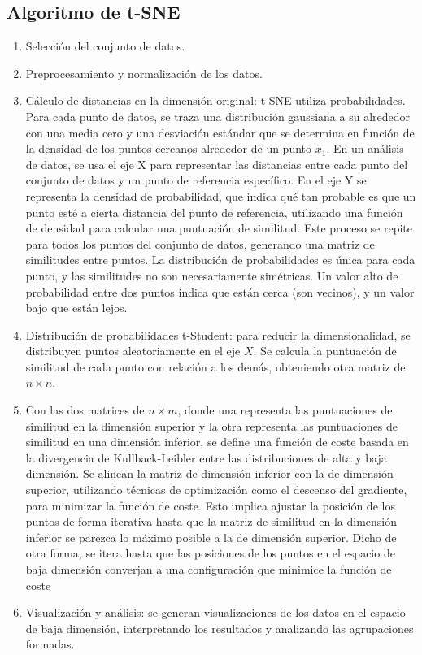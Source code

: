 \subsection{Algoritmo de t-SNE}
\begin{enumerate}
    \item Selección del conjunto de datos.
    \item Preprocesamiento y normalización de los datos.

    \item Cálculo de distancias en la dimensión original: t-SNE utiliza probabilidades. Para cada punto de datos, se traza una distribución gaussiana a su alrededor con una media cero y una desviación estándar que se determina en función de la densidad de los puntos cercanos alrededor de un punto $x_1$. En un análisis de datos, se usa el eje X para representar las distancias entre cada punto del conjunto de datos y un punto de referencia específico. En el eje Y se representa la densidad de probabilidad, que indica qué tan probable es que un punto esté a cierta distancia del punto de referencia, utilizando una función de densidad para calcular una puntuación de similitud. Este proceso se repite para todos los puntos del conjunto de datos, generando una matriz de similitudes entre puntos. La distribución de probabilidades es única para cada punto, y las similitudes no son necesariamente simétricas. Un valor alto de probabilidad entre dos puntos indica que están cerca (son vecinos), y un valor bajo que están lejos.


    \item Distribución de probabilidades t-Student: para reducir la dimensionalidad, se distribuyen puntos aleatoriamente en el eje $X$. Se calcula la puntuación de similitud de cada punto con relación a los demás, obteniendo otra matriz de $n\times n$. 


    \item Con las dos matrices de $n \times m$, donde una representa las puntuaciones de similitud en la dimensión superior y la otra representa las puntuaciones de similitud en una dimensión inferior, se define una función de coste basada en la divergencia de Kullback-Leibler entre las distribuciones de alta y baja dimensión. Se alinean la matriz de dimensión inferior con la de dimensión superior, utilizando técnicas de optimización como el descenso del gradiente, para minimizar la función de coste. Esto implica ajustar la posición de los puntos de forma iterativa hasta que la matriz de similitud en la dimensión inferior se parezca lo máximo posible a la de dimensión superior. Dicho de otra forma, se itera hasta que las posiciones de los puntos en el espacio de baja dimensión converjan a una configuración que minimice la función de coste

    
    \item  Visualización y análisis: se generan visualizaciones de los datos en el espacio de baja dimensión, interpretando los resultados y analizando las agrupaciones formadas.
\end{enumerate}


